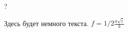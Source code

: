 \documentclass[a4paper,12pt]{article}
\begin{document}








\begin{enumerate}
\end{enumerate}

?

Здесь будет немного текста. 
\(f= 1/2\frac{a\sqrt{i}}{b}\)
\end{document}
